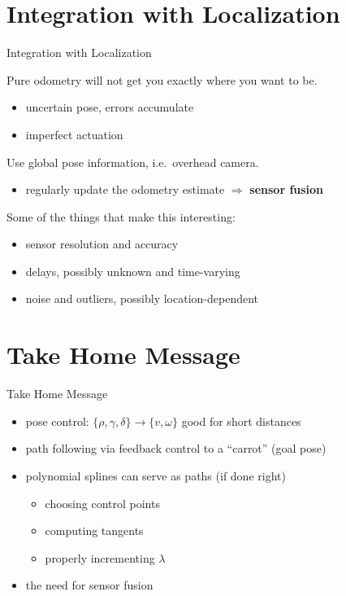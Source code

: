 \documentclass{beamer}
\begin{document}
\section{Integration with Localization}
\begin{frame}{Integration with Localization}
  
  Pure odometry will not get you exactly where you want to be.
  \begin{itemize}
  \item
    uncertain pose, errors accumulate
  \item
    imperfect actuation
  \end{itemize}
  
  \vfill
  
  Use global pose information, i.e.\ overhead camera.
  \begin{itemize}
  \item
    regularly update the odometry estimate $\Rightarrow$ \textbf{sensor fusion}
  \end{itemize}

  \vfill
  
  Some of the things that make this interesting:
  \begin{itemize}
  \item
    sensor resolution and accuracy
  \item
    delays, possibly unknown and time-varying
  \item
    noise and outliers, possibly location-dependent
  \end{itemize}
  
\end{frame}


\section{Take Home Message}

\begin{frame}{Take Home Message}
  
  \begin{itemize}
  \item
    pose control: $\{\rho, \gamma, \delta\} \rightarrow \{v,\omega\}$ good for short distances
  \item
    path following via feedback control to a ``carrot'' (goal pose)
  \item
    polynomial splines can serve as paths (if done right)
    \begin{itemize}
    \item
      choosing control points
    \item
      computing tangents
    \item
      properly incrementing $\lambda$
    \end{itemize}
  \item
    the need for sensor fusion
  \end{itemize}
  
\end{frame}
\end{document}
